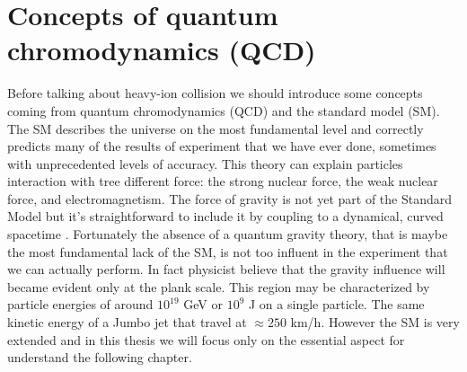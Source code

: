\documentclass[12pt,a4paper]{book}
\begin{document}
	\chapter{Concepts of quantum chromodynamics (QCD)}
	Before talking about heavy-ion collision we should introduce some concepts coming from quantum chromodynamics (QCD) and the standard model (SM). The SM describes the universe on the most fundamental level and correctly predicts many of the results of experiment that we have ever done, sometimes with unprecedented levels of accuracy. This theory can explain particles interaction with tree different force: the strong nuclear force, the weak nuclear force, and electromagnetism. The force of gravity is not yet part of the Standard Model but it’s straightforward to include it by coupling to a dynamical, curved spacetime \cite{quevedo2024cambridgelecturesstandardmodel}. Fortunately the absence of a quantum gravity theory, that is maybe the most fundamental lack of the SM, is not too influent in the experiment that we can actually perform. In fact physicist believe that the gravity influence will became evident only at the plank scale. This region may be characterized by particle energies of around $10^{19}$ GeV or $10^9$ J on a single particle. The same kinetic energy of a Jumbo jet that travel at $\approx 250$ km/h. However the SM is very extended and in this thesis we will focus only on the essential aspect for understand the following chapter. 
	
\end{document}
